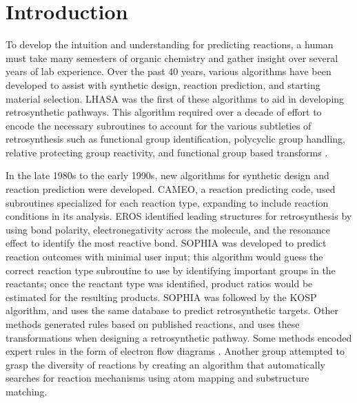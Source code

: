 

\section{Introduction}

To develop the intuition and understanding for predicting reactions, a human must take many semesters of organic chemistry and gather insight over several years of lab experience. Over the past 40 years, various algorithms have been developed to assist with synthetic design, reaction prediction, and starting material selection\cite{Todd_2005,Szymkuc_2016}. LHASA was the first of these algorithms to aid in developing retrosynthetic pathways\cite{Corey1971Centenary}. This algorithm required over a decade of effort to encode the necessary subroutines to account for the various subtleties of retrosynthesis such as functional group identification, polycyclic group handling, relative protecting group reactivity, and functional group based transforms \cite{corey1972techniques,corey1975general,corey1985computer,corey1972computer}. 

In the late 1980s to the early 1990s, new algorithms for synthetic design and reaction prediction were developed. CAMEO\cite{jorgensen1990cameo}, a reaction predicting code, used subroutines specialized for each reaction type, expanding to include reaction conditions in its analysis. EROS\cite{gasteiger1987new} identified leading structures for retrosynthesis by using bond polarity, electronegativity across the molecule, and the resonance effect to identify the most reactive bond. SOPHIA\cite{Satoh_1996} was developed to predict reaction outcomes with minimal user input; this algorithm would guess the correct reaction type subroutine to use by identifying important groups in the reactants; once the reactant type was identified, product ratios would be estimated for the resulting products. SOPHIA was followed by the KOSP algorithm, and uses the same database to predict retrosynthetic targets\cite{Satoh_1999}. Other methods generated rules based on published reactions, and uses these transformations when designing a retrosynthetic pathway\cite{ChemPlanner,Gelernter_1990}. Some methods encoded expert rules in the form of electron flow diagrams \cite{Baldi2009NoElectron,Chen2008SynthExplore}. Another group attempted to grasp the diversity of reactions by creating an algorithm that automatically searches for reaction mechanisms using atom mapping and substructure matching\cite{Law_2009}. 


